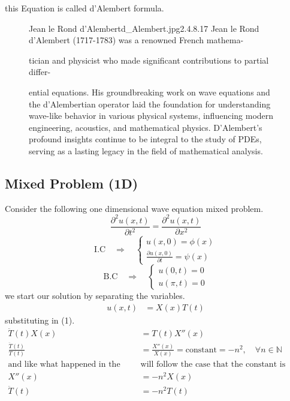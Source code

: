 \documentclass[]{article}
\begin{document}
this Equation is called d'Alembert formula.
\begin{figure}[b]
    \begin{enrichment}{Jean le Rond d'Alembert}{d_Alembert.jpg}{2.4}{.8}{.17}
        Jean le Rond d'Alembert (1717-1783) was a renowned French mathema-
        
        tician and physicist who made significant contributions to partial differ-
        
        ential equations. His groundbreaking work on wave equations and the d'Alembertian operator laid the foundation for understanding wave-like behavior in various physical systems, influencing modern engineering, acoustics, and mathematical physics.
        D'Alembert's profound insights continue to be integral to the study of PDEs, serving as a lasting legacy in the field of mathematical analysis.
    \end{enrichment}    
\end{figure}

\setcounter{equation}{0}
\subsection{Mixed Problem (1D)}
Consider the following one dimensional wave equation mixed problem.
\begin{equation}
\frac{\partial^2 u\left(x,t\right)}{\partial t^2}=\frac{\partial^2 u\left(x,t\right)}{\partial x^2}
\end{equation}
\begin{equation}
    \text{I.C} \quad \Longrightarrow \quad 
    \begin{cases}
    u\left(x,0 \right) = \phi\left(x\right)
    \\
    \frac{\partial u\left(x,0 \right)}{\partial t} = \psi\left(x\right)
    \end{cases}
\end{equation}
\begin{equation}
    \text{B.C} \quad \Longrightarrow \quad 
    \begin{cases}
    u\left(0,t \right) = 0
    \\
    u\left(\pi,t\right)=0
    \end{cases}
\end{equation}
we start our solution by separating the variables.
\begin{align}
u\left(x,t\right) &= X\left(x\right)T\left(t\right)
\end{align}
substituting in (1).
\begin{align*}
\ddot{T}\left(t\right)X\left(x\right)&=T\left(t\right)X''\left(x\right)
\\
\frac{\ddot{T}\left(t\right)}{T\left(t\right)} &= \frac{X''\left(x\right)}{X\left(x\right)}= \text{constant} = - n^2,\quad \forall n \in \mathbb{N}
\\
\text{and like what happened in the heat equation we }&\text{will follow the case that the constant is negative}
\\
X''\left(x\right)&=-n^2 X\left(x\right)
\\
\ddot{T}\left(t\right) &= -n^2 T\left(t\right)
\end{align*}
\end{document}
